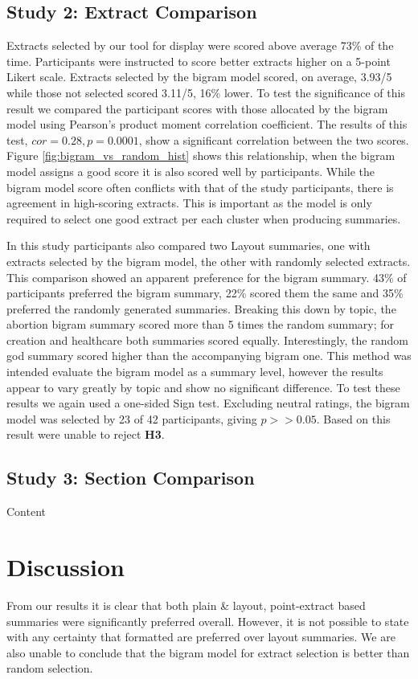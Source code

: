     \tocless\subsection{Study 2: Extract Comparison}
      Extracts selected by our tool for display were scored above average 73\% of the time. Participants were instructed to score better extracts higher on a 5-point Likert scale. Extracts selected by the bigram model scored, on average, 3.93/5 while those not selected scored 3.11/5, 16\% lower. To test the significance of this result we compared the participant scores with those allocated by the bigram model using Pearson's product moment correlation coefficient. The results of this test, $cor = 0.28, p = 0.0001$, show a significant correlation between the two scores. Figure \ref{fig:bigram_vs_random_hist} shows this relationship, when the bigram model assigns a good score it is also scored well by participants. While the bigram model score often conflicts with that of the study participants, there is agreement in high-scoring extracts. This is important as the model is only required to select one good extract per each cluster when producing summaries.

      In this study participants also compared two Layout summaries, one with extracts selected by the bigram model, the other with randomly selected extracts. This comparison showed an apparent preference for the bigram summary. 43\% of participants preferred the bigram summary, 22\% scored them the same and 35\% preferred the randomly generated summaries. Breaking this down by topic, the abortion bigram summary scored more than 5 times the random summary; for creation and healthcare both summaries scored equally. Interestingly, the random god summary scored higher than the accompanying bigram one. This method was intended evaluate the bigram model as a summary level, however the results appear to vary greatly by topic and show no significant difference. To test these results we again used a one-sided Sign test. Excluding neutral ratings, the bigram model was selected by 23 of 42 participants, giving $p >> 0.05$. Based on this result were unable to reject \textbf{H3}.

    \tocless\subsection{Study 3: Section Comparison}
      Content

  \section{Discussion}
    From our results it is clear that both plain \& layout, point-extract based summaries were significantly preferred overall. However, it is not possible to state with any certainty that formatted are preferred over layout summaries. We are also unable to conclude that the bigram model for extract selection is better than random selection.


